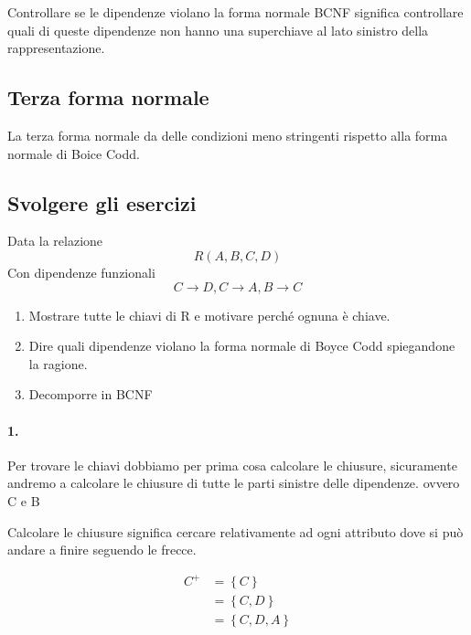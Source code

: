 Controllare se le dipendenze violano la forma normale BCNF significa controllare quali di queste dipendenze non hanno una superchiave al lato sinistro della rappresentazione.

\subsection{Terza forma normale}

La terza forma normale da delle condizioni meno stringenti rispetto alla forma normale di Boice Codd.

\subsection{Svolgere gli esercizi}

\begin{exmp}
    Data la relazione 
    \[R(A,B,C,D)\]
    Con dipendenze funzionali
    \[ C \rightarrow D,C \rightarrow A,B \rightarrow C \]
    
    \begin{enumerate}
        \item Mostrare tutte le chiavi di R e motivare perché ognuna è chiave.
        \item Dire quali dipendenze violano la forma normale di Boyce Codd spiegandone la ragione.
        \item Decomporre in BCNF
    \end{enumerate}
    
    \paragraph{1.} Per trovare le chiavi dobbiamo per prima cosa calcolare le chiusure, sicuramente andremo a calcolare le chiusure di tutte le parti sinistre delle dipendenze. ovvero C e B

    Calcolare le chiusure significa cercare relativamente ad ogni attributo dove si può andare a finire seguendo le frecce.

    \begin{equation}
        \begin{split}
            C^+&= \left\{ C \right\} \\
            &= \left\{ C,D \right\}  \\
            &= \left\{ C,D,A \right\}  \\
        \end{split}
    \end{equation}


\end{exmp}
